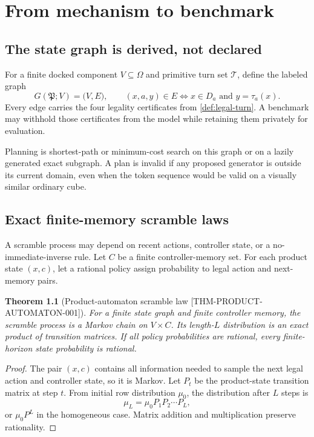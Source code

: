\documentclass[11pt,openany]{book}
\newcommand{\Atlas}{\mathfrak P}
\newcommand{\States}{\Omega}
\newcommand{\Turns}{\mathcal T}
\newcommand{\claimid}[1]{\textnormal{\sffamily\footnotesize[#1]}}
\theoremstyle{polyplain}
\newtheorem{theorem}{Theorem}[chapter]
\theoremstyle{polydef}
\begin{document}
\chapter{From mechanism to benchmark}
\label{chap:benchmark}

\section{The state graph is derived, not declared}

For a finite docked component $V\subseteq\States$ and primitive turn set $\Turns$, define the labeled graph
\[
G(\Atlas;V)=
\bigl(V,E\bigr),
\qquad
(x,a,y)\in E
\iff
x\in D_a\text{ and }y=\tau_a(x).
\]
Every edge carries the four legality certificates from \cref{def:legal-turn}. A benchmark may withhold those certificates from the model while retaining them privately for evaluation.

Planning is shortest-path or minimum-cost search on this graph or on a lazily generated exact subgraph. A plan is invalid if any proposed generator is outside its current domain, even when the token sequence would be valid on a visually similar ordinary cube.

\section{Exact finite-memory scramble laws}

A scramble process may depend on recent actions, controller state, or a no-immediate-inverse rule. Let $C$ be a finite controller-memory set. For each product state $(x,c)$, let a rational policy assign probability to legal action and next-memory pairs.

\begin{theorem}[Product-automaton scramble law \claimid{THM-PRODUCT-AUTOMATON-001}]
\label{thm:product-automaton-scramble}
For a finite state graph and finite controller memory, the scramble process is a Markov chain on $V\times C$. Its length-$L$ distribution is an exact product of transition matrices. If all policy probabilities are rational, every finite-horizon state probability is rational.
\end{theorem}

\begin{proof}
The pair $(x,c)$ contains all information needed to sample the next legal action and controller state, so it is Markov. Let $P_t$ be the product-state transition matrix at step $t$. From initial row distribution $\mu_0$, the distribution after $L$ steps is
\[
\mu_L=\mu_0P_1P_2\cdots P_L,
\]
or $\mu_0P^L$ in the homogeneous case. Matrix addition and multiplication preserve rationality.
\end{proof}
\end{document}
